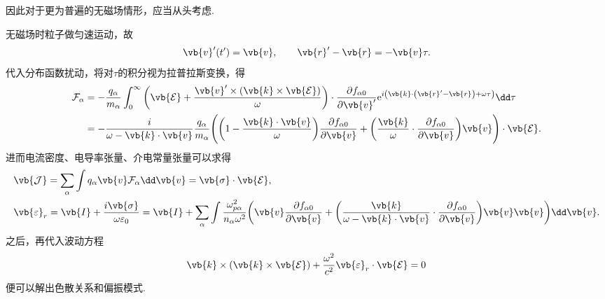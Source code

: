 因此对于更为普遍的无磁场情形，应当从头考虑.

无磁场时粒子做匀速运动，故
\begin{align*}
	\vb{v}^\prime(t^\prime)=\vb{v},\qquad \vb{r}^\prime - \vb{r}=-\vb{v}\tau.
\end{align*}
代入分布函数扰动，将对\(\tau\)的积分视为拉普拉斯变换，得
\begin{align*}
	\mathcal{F}_\alpha &= -\frac{q_\alpha}{m_\alpha}\int_{0}^{\infty}\left(\vb{\mathcal{E}}+\frac{\vb{v}^\prime\times\left(\vb{k}\times\vb{\mathcal{E}}\right)}{\omega}\right)\cdot\frac{\partial f_{\alpha0}}{\partial\vb{v}^\prime}\mathrm{e}^{i\left(\vb{k}\cdot\left(\vb{r}^\prime-\vb{r}\right)+\omega\tau\right)}\dd \tau\\
	&= -\frac{i}{\omega-\vb{k}\cdot\vb{v}}\frac{q_\alpha}{m_\alpha}\Bigg(\bigg(1-\frac{\vb{k}\cdot\vb{v}}{\omega}\bigg)\frac{\partial f_{\alpha0}}{\partial\vb{v}}+\bigg(\frac{\vb{k}}{\omega}\cdot\frac{\partial f_{\alpha0}}{\partial\vb{v}}\bigg)\vb{v}\Bigg)\cdot\vb{\mathcal{E}}.
\end{align*}
进而电流密度、电导率张量、介电常量张量可以求得
\begin{align*}
	&\vb{\mathcal{J}} = \sum_\alpha\int q_\alpha\vb{v}\mathcal{F}_\alpha\dd \vb{v} = \vb{\sigma}\cdot\vb{\mathcal{E}},\\
	&\vb{\varepsilon}_r = \vb{I} + \frac{i\vb{\sigma}}{\omega\varepsilon_0} = \vb{I} + \sum_\alpha\int\frac{\omega_{p\alpha}^2}{n_\alpha\omega^2}\bigg(\vb{v}\frac{\partial f_{\alpha0}}{\partial\vb{v}}+\bigg(\frac{\vb{k}}{\omega-\vb{k}\cdot\vb{v}}\cdot\frac{\partial f_{\alpha0}}{\partial\vb{v}}\bigg)\vb{v}\vb{v}\bigg)\dd \vb{v}.
\end{align*}
之后，再代入波动方程
\begin{align*}
	\vb{k}\times\left(\vb{k}\times\vb{\mathcal{E}}\right) + \frac{\omega^2}{c^2}\vb{\varepsilon}_r\cdot\vb{\mathcal{E}} = 0
\end{align*}
便可以解出色散关系和偏振模式.

